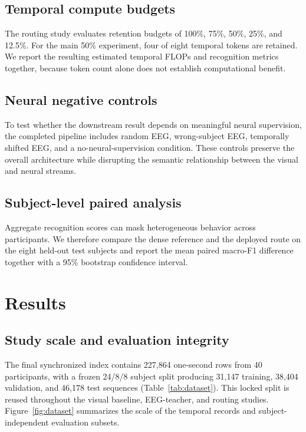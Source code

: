 \documentclass[runningheads]{llncs}
\begin{document}
\subsection{Temporal compute budgets}

The routing study evaluates retention budgets of 100\%, 75\%, 50\%, 25\%, and 12.5\%. For the main 50\% experiment, four of eight temporal tokens are retained. We report the resulting estimated temporal FLOPs and recognition metrics together, because token count alone does not establish computational benefit.

\subsection{Neural negative controls}

To test whether the downstream result depends on meaningful neural supervision, the completed pipeline includes random EEG, wrong-subject EEG, temporally shifted EEG, and a no-neural-supervision condition. These controls preserve the overall architecture while disrupting the semantic relationship between the visual and neural streams.

\subsection{Subject-level paired analysis}

Aggregate recognition scores can mask heterogeneous behavior across participants. We therefore compare the dense reference and the deployed route on the eight held-out test subjects and report the mean paired macro-F1 difference together with a 95\% bootstrap confidence interval.

\section{Results}

\subsection{Study scale and evaluation integrity}

The final synchronized index contains 227,864 one-second rows from 40 participants, with a frozen 24/8/8 subject split producing 31,147 training, 38,404 validation, and 46,178 test sequences (Table~\ref{tab:dataset}). This locked split is reused throughout the visual baseline, EEG-teacher, and routing studies. Figure~\ref{fig:dataset} summarizes the scale of the temporal records and subject-independent evaluation subsets.
\end{document}
